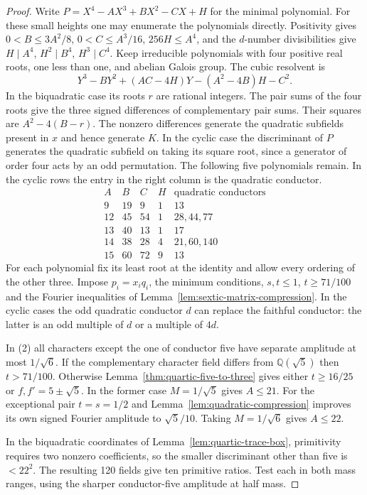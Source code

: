\documentclass[11pt,reqno]{amsart}
\theoremstyle{remark}\newtheorem{remark}[theorem]{Remark}
\numberwithin{equation}{section}
\begin{document}
\begin{proof}
Write $P=X^4-AX^3+BX^2-CX+H$ for the minimal polynomial. For these small heights one may enumerate the polynomials directly. Positivity gives $0<B\le3A^2/8$, $0<C\le A^3/16$, $256H\le A^4$, and the $d$-number divisibilities give $H\mid A^4$, $H^2\mid B^4$, $H^3\mid C^4$. Keep irreducible polynomials with four positive real roots, one less than one, and abelian Galois group. The cubic resolvent is
\[
 Y^3-BY^2+(AC-4H)Y-(A^2-4B)H-C^2.
\]
In the biquadratic case its roots $r$ are rational integers. The pair sums of the four roots give the three signed differences of complementary pair sums. Their squares are $A^2-4(B-r)$. The nonzero differences generate the quadratic subfields present in $x$ and hence generate $K$. In the cyclic case the discriminant of $P$ generates the quadratic subfield on taking its square root, since a generator of order four acts by an odd permutation. The following five polynomials remain. In the cyclic rows the entry in the right column is the quadratic conductor.
\[
\begin{array}{rrrr|l}
 A&B&C&H&\text{quadratic conductors}\\\hline
 9&19&9&1&13\\
 12&45&54&1&28,44,77\\
 13&40&13&1&17\\
 14&38&28&4&21,60,140\\
 15&60&72&9&13
\end{array}
\]
For each polynomial fix its least root at the identity and allow every
ordering of the other three. Impose $p_i=x_iq_i$, the minimum conditions,
$s,t\le1$, $t\ge71/100$ and the Fourier inequalities of
Lemma~\ref{lem:sextic-matrix-compression}. In the cyclic cases the odd
quadratic conductor $d$ can replace the faithful conductor: the latter
is an odd multiple of $d$ or a multiple of $4d$.

In (2) all characters except the one of conductor five have separate amplitude at most $1/\sqrt6$. If the complementary character field differs from $\mathbb Q(\sqrt5)$ then $t>71/100$. Otherwise Lemma~\ref{thm:quartic-five-to-three} gives either $t\ge16/25$ or $f,f'=5\pm\sqrt5$. In the former case $M=1/\sqrt5$ gives $A\le21$. For the exceptional pair $t=s=1/2$ and Lemma~\ref{lem:quadratic-compression} improves its own signed Fourier amplitude to $\sqrt5/10$. Taking $M=1/\sqrt6$ gives $A\le22$.

In the biquadratic coordinates of Lemma~\ref{lem:quartic-trace-box},
primitivity requires two nonzero coefficients, so the smaller
discriminant other than five is $<22^2$. The resulting 120 fields
give ten primitive ratios. Test each in both mass ranges, using the
sharper conductor-five amplitude at half mass.


\end{proof}
\end{document}
